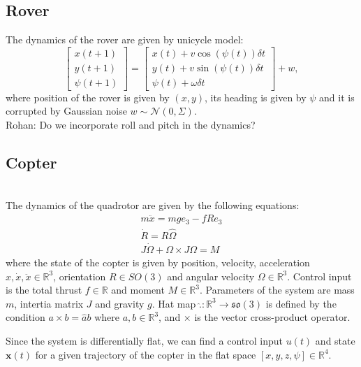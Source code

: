 \documentclass[conference]{IEEEtran}
\newcommand{\rohan}[1]{{\color{blue} Rohan: #1}}
\begin{document}
\subsection{Rover }
The dynamics of the rover are given by unicycle model:
\begin{equation}
    \begin{bmatrix}
        x(t+1) \\
        y(t+1) \\
        \psi(t+1)
    \end{bmatrix} = \begin{bmatrix}x(t) + v \cos(\psi(t)) \delta{t}\\ y(t) + v \sin(\psi(t)) \delta{t}\\ \psi(t) + \omega \delta{t} \end{bmatrix} + w,
\end{equation}
where position of the rover is given by $(x,y)$, its heading is given by $\psi$ and it is corrupted by Gaussian noise $w \sim \mathcal{N}(0,\Sigma)$. \\
\rohan{Do we incorporate roll and pitch in the dynamics?}

\subsection{Copter}
 \\
The dynamics of the quadrotor are given by the following equations:
\begin{gather}
m\ddot{x} = mge_{3} - fRe_{3} \\
\dot{R} = R\hat{\Omega} \\
J\dot{\Omega} + \Omega \times J\Omega = M 
\end{gather}
where the state of the copter is given by position, velocity, acceleration $x, \dot{x}, \ddot{x} \in \mathbb{R}^3$, orientation $R \in SO(3)$ and angular velocity $\Omega \in \mathbb{R}^3$.
Control input is the total thrust $f \in \mathbb{R}$ and moment $M \in \mathbb{R}^3$.
Parameters of the system are mass $m$, intertia matrix $J$ and gravity $g$.
Hat map $\hat{.}: \mathbb{R}^3 \to \mathfrak{so}(3)$ is defined by the condition $a \times b = \hat{a}b$ where $a,b\in \mathbb{R}^3$, and $\times$ is the vector cross-product operator.

Since the system is differentially flat, we can find a control input $u(t)$ and state $\boldsymbol{x}(t)$ for a given trajectory of the copter in the flat space $[x, y, z, \psi] \in \mathbb{R}^4$.
\end{document}

